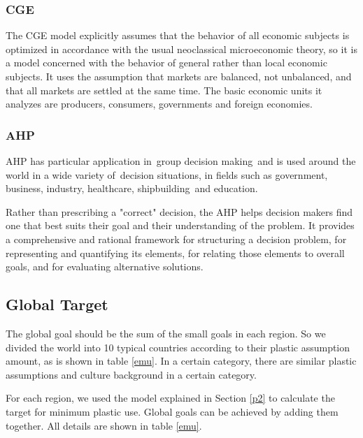\documentclass{mcmthesis}
\begin{document}
\subsubsection{CGE}

The CGE model explicitly assumes that the behavior of all economic subjects is optimized in accordance with the usual neoclassical microeconomic theory, so it is a model concerned with the behavior of general rather than local economic subjects. It uses the assumption that markets are balanced, not unbalanced, and that all markets are settled at the same time. The basic economic units it analyzes are producers, consumers, governments and foreign economies\cite{CGE}.

\subsubsection{AHP}

AHP has particular application in group decision making and is used around the world in a wide variety of decision situations, in fields such as government, business, industry, healthcare, shipbuilding and education.

Rather than prescribing a "correct" decision, the AHP helps decision makers find one that best suits their goal and their understanding of the problem. It provides a comprehensive and rational framework for structuring a decision problem, for representing and quantifying its elements, for relating those elements to overall goals, and for evaluating alternative solutions\cite{Analytic}.

\subsection{Global Target}

The global goal should be the sum of the small goals in each region. So we divided the world into 10 typical countries according to their plastic assumption amount, as is shown in table \ref{emu}. In a certain category, there are similar plastic assumptions and culture background in a certain category.

For each region, we used the model explained in Section \ref{p2} to calculate the target for minimum plastic use. Global goals can be achieved by adding them together. All details are shown in table \ref{emu}.
\end{document}
